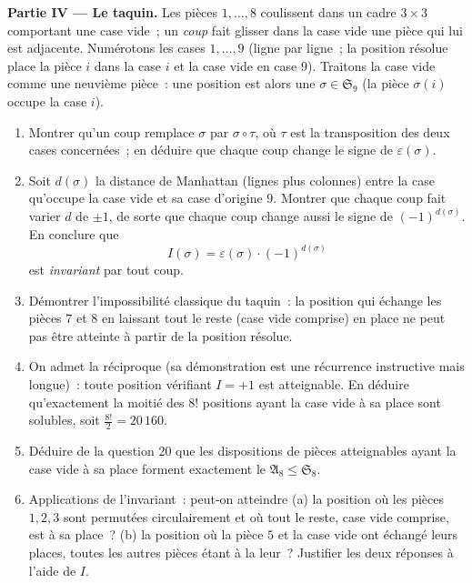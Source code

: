 \begin{problem}
\medskip
\noindent\textbf{Partie IV --- Le taquin.} Les pièces $1, \dots, 8$
coulissent dans un cadre $3 \times 3$ comportant une case vide~; un
\emph{coup} fait glisser dans la case vide une pièce qui lui est
adjacente. Numérotons les cases $1, \dots, 9$ (ligne par ligne~; la
position résolue place la pièce $i$ dans la case $i$ et la case vide
en case $9$). Traitons la case vide comme une neuvième pièce~: une
position est alors une  $\sigma \in \mathfrak S_9$ (la
pièce $\sigma(i)$ occupe la case $i$).
\begin{enumerate}[resume]
  \item Montrer qu'un coup remplace $\sigma$ par $\sigma \circ \tau$,
        où $\tau$ est la transposition des deux cases concernées~;
        en déduire que chaque coup change le signe de
        $\varepsilon(\sigma)$.
  \item Soit $d(\sigma)$ la distance de Manhattan (lignes plus
        colonnes) entre la case qu'occupe la case vide et sa case
        d'origine $9$. Montrer que chaque coup fait varier $d$ de
        $\pm1$, de sorte que chaque coup change aussi le signe de
        $(-1)^{d(\sigma)}$. En conclure que
        \[
        I(\sigma) = \varepsilon(\sigma)\cdot(-1)^{d(\sigma)}
        \]
        est \emph{invariant} par tout coup.
  \item Démontrer l'impossibilité classique du taquin~: la position
        qui échange les pièces $7$ et $8$ en laissant tout le reste
        (case vide comprise) en place ne peut pas être atteinte à
        partir de la position résolue.
  \item On admet la réciproque (sa démonstration est une récurrence
        instructive mais longue)~: toute position vérifiant $I = +1$
        est atteignable. En déduire qu'exactement la moitié des $8!$
        positions ayant la case vide à sa place sont solubles, soit
        $\frac{8!}2 = 20\,160$.
  \item Déduire de la question 20 que les dispositions de pièces
        atteignables ayant la case vide à sa place forment exactement
        le  $\mathfrak A_8 \leq \mathfrak S_8$.
  \item Applications de l'invariant~: peut-on atteindre (a) la
        position où les pièces $1, 2, 3$ sont permutées circulairement
        et où tout le reste, case vide comprise, est à sa place~?
        (b) la position où la pièce $5$ et la case vide ont échangé
        leurs places, toutes les autres pièces étant à la leur~?
        Justifier les deux réponses à l'aide de $I$.
\end{enumerate}


\end{problem}
